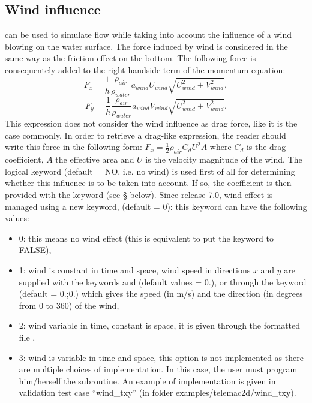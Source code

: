 \subsection{Wind influence}

 can be used to simulate flow while taking into account the
influence of a wind blowing on the water surface.
The force induced by wind is considered in the same way as the friction effect
on the bottom.
The following force is consequentely added to the right handside term of the
momentum equation:
\begin{equation}
F_x = \frac{1}{h} \frac{\rho_{air}}{\rho_{water}}a_{wind}U_{wind}\sqrt{U^2_{wind}+V^2_{wind}},
\end{equation}
\begin{equation}
F_y = \frac{1}{h} \frac{\rho_{air}}{\rho_{water}}a_{wind}V_{wind}\sqrt{U^2_{wind}+V^2_{wind}}.
\end{equation}
This expression does not consider the wind influence as drag force,
like it is the case commonly.
In order to retrieve a drag-like expression, the reader should write this force
in the following form:
$F_x = \frac{1}{2}\rho_{air}C_d U^2 A$ where $C_d$ is the drag coefficient,
$A$ the effective area and $U$ is the velocity magnitude of the wind.
The logical keyword  (default = NO, i.e. no wind) is used first of
all for determining whether this influence is to be taken into account.
If so, the coefficient is then provided with the keyword
 (see {\S} below).
Since release 7.0, wind effect is managed using a new keyword,
 (default = 0): this keyword can have the following
values:

\begin{itemize}
\item 0: this means no wind effect (this is equivalent to put the
 keyword  to FALSE),

\item 1: wind is constant in time and space, wind speed in directions
$x$ and $y$ are supplied with the keywords  and
 (default values = 0.),
or through the keyword  (default = 0.;0.)
which gives the speed (in m/s) and the direction (in degrees from 0 to 360) of
the wind,

\item 2: wind variable in time, constant is space,
it is given through the formatted file ,

\item 3: wind is variable in time and space, this option is not
implemented as there are multiple choices of implementation.
In this case, the user must program him/herself the  subroutine.
An example of implementation is given in validation test case ``wind\_txy''
(in folder examples/telemac2d/wind\_txy).
\end{itemize}

